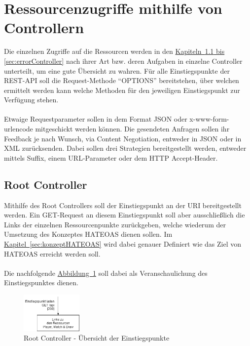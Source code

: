 \section{Ressourcenzugriffe mithilfe von Controllern}
Die einzelnen Zugriffe auf die Ressourcen werden in den \hyperref[sec:rootController, sec:errorController]{Kapiteln~\ref{sec:rootController} bis \ref{sec:errorController}} nach ihrer Art bzw. deren Aufgaben in einzelne Controller unterteilt, um eine gute Übersicht zu wahren. Für alle Einstiegspunkte der \gls{REST}-\gls{API} soll die Request-Methode \enquote{OPTIONS} bereitstehen, über welchen ermittelt werden kann welche Methoden für den jeweiligen Einstiegspunkt zur Verfügung stehen.\\
\\
Etwaige Requestparameter sollen in dem Format \gls{JSON} oder x-www-form-urlencode mitgeschickt werden können. Die gesendeten Anfragen sollen ihr Feedback je nach Wunsch, via Content Negotiation, entweder in \gls{JSON} oder in \gls{XML} zurücksenden. Dabei sollen drei Strategien bereitgestellt werden, entweder mittels Suffix, einem URL-Parameter oder dem \gls{HTTP} Accept-Header. 

\subsection{Root Controller}\label{sec:rootController}
Mithilfe des Root Controllers soll der Einstiegspunkt an der \gls{URI}  bereitgestellt werden. Ein GET-Request an diesem Einstiegspunkt soll aber ausschließlich die Links der einzelnen Ressourcenpunkte zurückgeben, welche wiederum der Umsetzung des Konzeptes HATEOAS dienen sollen. Im \hyperref[sec:konzeptHATEOAS]{Kapitel~\ref{sec:konzeptHATEOAS}} wird dabei genauer Definiert wie das Ziel von HATEOAS erreicht werden soll.\\
\\
Die nachfolgende \hyperref[fig:rootController]{Abbildung~\ref{fig:rootController}} soll dabei als Veranschaulichung des Einstiegspunktes dienen.
\begin{figure}[htb]
	\includegraphics[width=0.266\textwidth]{images/root-controller.png}
	\caption{Root Controller - Übersicht der Einstiegspunkte}
	\label{fig:rootController}
\end{figure}

